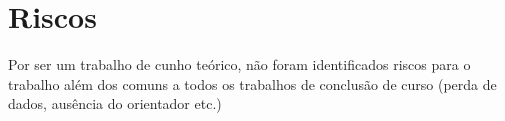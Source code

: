 \documentclass[12pt]{article}
\begin{document}
\section{Riscos}
    Por ser um trabalho de cunho teórico, não foram identificados riscos para o trabalho
    além dos comuns a todos os trabalhos de conclusão de curso (perda de dados, ausência
    do orientador etc.)



\end{document}
